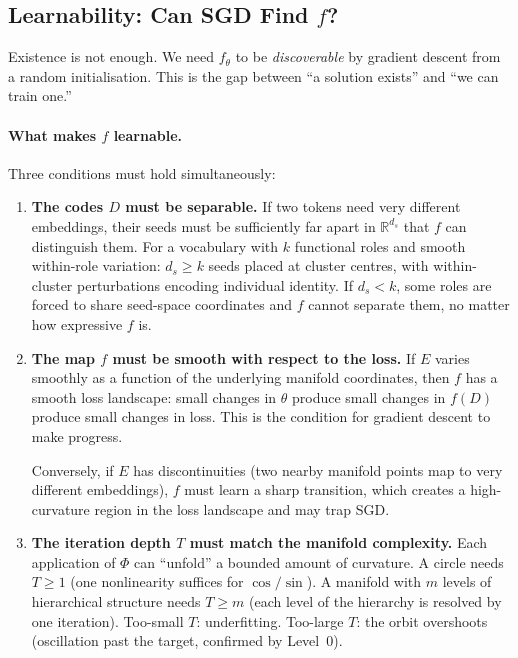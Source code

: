 \documentclass[11pt, a4paper]{article}
\newcommand{\R}{\mathbb{R}}
\theoremstyle{remark}
\begin{document}
\subsection{Learnability: Can SGD Find $f$?}

Existence is not enough.
We need $f_\theta$ to be \emph{discoverable} by gradient descent from a random initialisation.
This is the gap between ``a solution exists'' and ``we can train one.''

\paragraph{What makes $f$ learnable.}
Three conditions must hold simultaneously:

\begin{enumerate}
    \item \textbf{The codes $D$ must be separable.}
    If two tokens need very different embeddings, their seeds must be sufficiently far apart
    in $\R^{d_s}$ that $f$ can distinguish them.
    For a vocabulary with $k$ functional roles and smooth within-role variation:
    $d_s \geq k$ seeds placed at cluster centres, with within-cluster perturbations encoding
    individual identity.
    If $d_s < k$, some roles are forced to share seed-space coordinates and $f$ cannot
    separate them, no matter how expressive $f$ is.

    \item \textbf{The map $f$ must be smooth with respect to the loss.}
    If $E$ varies smoothly as a function of the underlying manifold coordinates,
    then $f$ has a smooth loss landscape: small changes in $\theta$ produce small changes
    in $f(D)$ produce small changes in loss.
    This is the condition for gradient descent to make progress.

    Conversely, if $E$ has discontinuities (two nearby manifold points map to very different
    embeddings), $f$ must learn a sharp transition, which creates a high-curvature region in the
    loss landscape and may trap SGD.

    \item \textbf{The iteration depth $T$ must match the manifold complexity.}
    Each application of $\Phi$ can ``unfold'' a bounded amount of curvature.
    A circle needs $T \geq 1$ (one nonlinearity suffices for $\cos/\sin$).
    A manifold with $m$ levels of hierarchical structure needs $T \geq m$
    (each level of the hierarchy is resolved by one iteration).
    Too-small $T$: underfitting. Too-large $T$: the orbit overshoots
    (oscillation past the target, confirmed by Level~0).
\end{enumerate}
\end{document}
